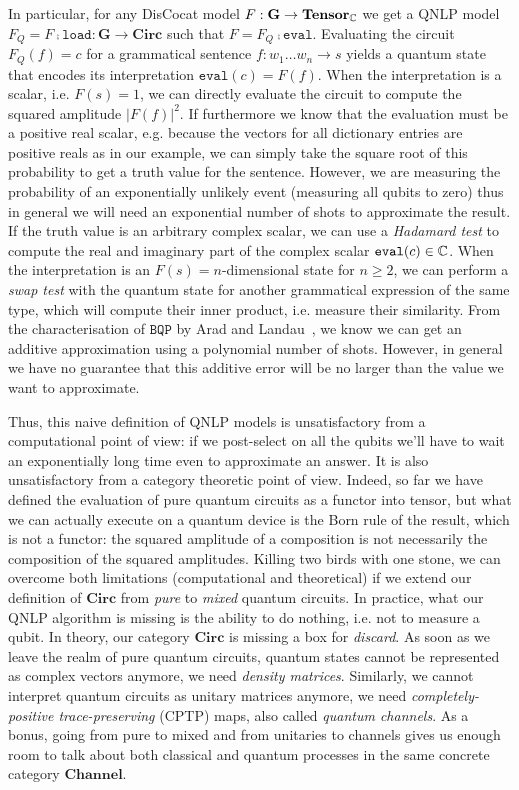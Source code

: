 In particular, for any DisCocat model $F : \mathbf{G} \to \mathbf{Tensor}_{\mathbb{C}}$ we get a QNLP model $F_Q = F \fcmp \mathtt{load} : \mathbf{G} \to \mathbf{Circ}$ such that $F = F_Q \fcmp \mathtt{eval}$.
Evaluating the circuit $F_Q(f) = c$ for a grammatical sentence $f : w_1 \dots w_n \to s$ yields a quantum state that encodes its interpretation $\mathtt{eval}(c) = F(f)$.
When the interpretation is a scalar, i.e. $F(s) = 1$, we can directly evaluate the circuit to compute the squared amplitude $\vert F(f) \vert^2$.
If furthermore we know that the evaluation must be a positive real scalar, e.g. because the vectors for all dictionary entries are positive reals as in our example, we can simply take the square root of this probability to get a truth value for the sentence.
However, we are measuring the probability of an exponentially unlikely event (measuring all qubits to zero) thus in general we will need an exponential number of shots to approximate the result.
If the truth value is an arbitrary complex scalar, we can use a \emph{Hadamard test} to compute the real and imaginary part of the complex scalar $\mathtt{eval}(c) \in \mathbb{C}$.
When the interpretation is an $F(s) = n$-dimensional state for $n \geq 2$, we can perform a \emph{swap test} with the quantum state for another grammatical expression of the same type, which will compute their inner product, i.e. measure their similarity.
From the characterisation of $\mathtt{BQP}$ by Arad and Landau~\cite{AradLandau10}, we know we can get an additive approximation using a polynomial number of shots.
However, in general we have no guarantee that this additive error will be no larger than the value we want to approximate.

Thus, this naive definition of QNLP models is unsatisfactory from a computational point of view: if we post-select on all the qubits we'll have to wait an exponentially long time even to approximate an answer.
It is also unsatisfactory from a category theoretic point of view.
Indeed, so far we have defined the evaluation of pure quantum circuits as a functor into tensor, but what we can actually execute on a quantum device is the Born rule of the result, which is not a functor: the squared amplitude of a composition is not necessarily the composition of the squared amplitudes.
Killing two birds with one stone, we can overcome both limitations (computational and theoretical) if we extend our definition of $\mathbf{Circ}$ from \emph{pure} to \emph{mixed} quantum circuits.
In practice, what our QNLP algorithm is missing is the ability to do nothing, i.e. not to measure a qubit.
In theory, our category $\mathbf{Circ}$ is missing a box for \emph{discard}.
As soon as we leave the realm of pure quantum circuits, quantum states cannot be represented as complex vectors anymore, we need \emph{density matrices}.
Similarly, we cannot interpret quantum circuits as unitary matrices anymore, we need \emph{completely-positive trace-preserving} (CPTP) maps, also called \emph{quantum channels}.
As a bonus, going from pure to mixed and from unitaries to channels gives us enough room to talk about both classical and quantum processes in the same concrete category $\mathbf{Channel}$.
